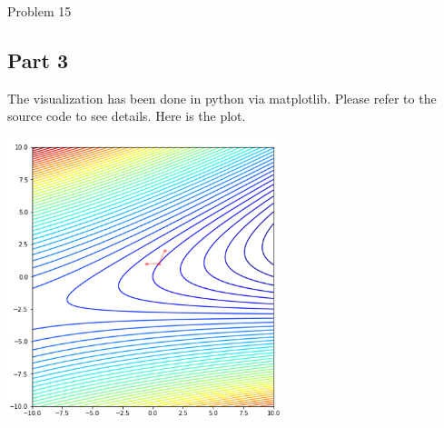 \documentclass[10pt]{article}
\begin{document}
\begin{section}{Problem 15}
	\subsection{Part 3}
	The visualization has been done in python via matplotlib. Please refer to the source code to see details. Here is the plot. 

		\includegraphics[width=8cm]{img/problem15_plt1.png}


\end{section}
\end{document}
